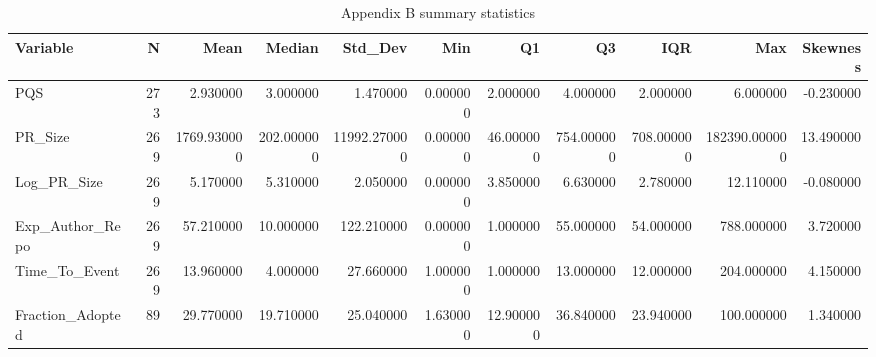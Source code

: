 \begin{table}
\caption{Appendix B summary statistics}
\label{tab:appendix-b-summary}
\begin{tabular}{lrrrrrrrrrr}
\toprule
Variable & N & Mean & Median & Std\_Dev & Min & Q1 & Q3 & IQR & Max & Skewness \\
\midrule
PQS & 273 & 2.930000 & 3.000000 & 1.470000 & 0.000000 & 2.000000 & 4.000000 & 2.000000 & 6.000000 & -0.230000 \\
PR\_Size & 269 & 1769.930000 & 202.000000 & 11992.270000 & 0.000000 & 46.000000 & 754.000000 & 708.000000 & 182390.000000 & 13.490000 \\
Log\_PR\_Size & 269 & 5.170000 & 5.310000 & 2.050000 & 0.000000 & 3.850000 & 6.630000 & 2.780000 & 12.110000 & -0.080000 \\
Exp\_Author\_Repo & 269 & 57.210000 & 10.000000 & 122.210000 & 0.000000 & 1.000000 & 55.000000 & 54.000000 & 788.000000 & 3.720000 \\
Time\_To\_Event & 269 & 13.960000 & 4.000000 & 27.660000 & 1.000000 & 1.000000 & 13.000000 & 12.000000 & 204.000000 & 4.150000 \\
Fraction\_Adopted & 89 & 29.770000 & 19.710000 & 25.040000 & 1.630000 & 12.900000 & 36.840000 & 23.940000 & 100.000000 & 1.340000 \\
\bottomrule
\end{tabular}
\end{table}
